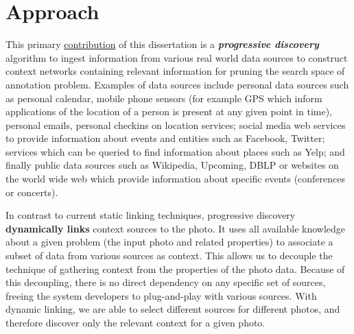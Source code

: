 \section{Approach}
This primary \uline{contribution} of this dissertation is a \textbf{\textit{progressive discovery}} algorithm to ingest information from various real world data sources to construct context networks containing relevant information for pruning the search space of annotation problem. Examples of data sources include personal data sources such as personal calendar, mobile phone sensors (for example GPS which inform applications of the location of a person is present at any given point in time), personal emails, personal checkins on location services; social media web services to provide information about events and entities such as Facebook, Twitter; services which can be queried to find information about places such as Yelp; and finally public data sources such as Wikipedia, Upcoming, DBLP or websites on the world wide web which provide information about specific events (conferences or concerts).

In contrast to current static linking techniques, progressive discovery \textbf{dynamically links} context sources to the photo. It uses all available knowledge about a given problem (the input photo and related properties) to associate a subset of data from various sources as context. This allows us to decouple the technique of gathering context from the properties of the photo data. Because of this decoupling, there is no direct dependency on any specific set of sources, freeing the system developers to plug-and-play with various sources. With dynamic linking, we are able to select different sources for different photos, and therefore discover only the relevant context for a given photo.


